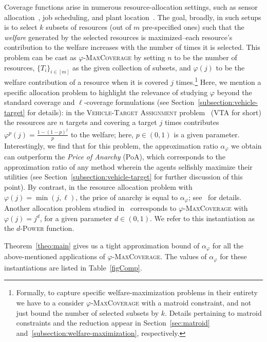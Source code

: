 Coverage functions arise in numerous resource-allocation settings, such as sensor allocation~\cite{MW08}, job scheduling, and plant location~\cite{CFN77}. The goal, broadly, in such setups is to select $k$ subsets of resources (out of $m$ pre-specified ones) such that the \emph{welfare} generated by the selected resources is maximized--each resource's contribution to the welfare increases with the number of times it is selected. This problem can be cast as $\varphi$-\textsc{MaxCoverage} by setting $n$ to be the number of resources, $\{T_i\}_{i\in [m]}$ as the given collection of subsets, and $\varphi(j)$ to be the welfare contribution of a resource when it is covered $j$ times.\footnote{Formally, to capture specific welfare-maximization problems in their entirety we have to a consider $\varphi$-\textsc{MaxCoverage} with a matroid constraint, and not just bound the number of selected subsets by $k$. Details pertaining to matroid constraints and the reduction appear in Section~\ref{sec:matroid} and~\ref{subsection:welfare-maximization}, respectively.}  Here, we mention a specific allocation problem to highlight the relevance of studying $\varphi$ beyond the standard coverage and $\ell$-coverage formulations (see Section~\ref{subsection:vehicle-target} for details): in the \textsc{Vehicle-Target Assignment} problem~\cite{Murphey00,PM19} (\textsc{VTA} for short) the resources are $n$ targets and covering a target $j$ times contributes $\varphi^p(j) = \frac{1-(1-p)^j}{p}$ to the welfare; here, $p \in (0,1)$ is a given parameter. Interestingly, we find that for this problem, the approximation ratio $\alpha_{\varphi}$ we obtain can outperform the \emph{Price of Anarchy} (PoA), which corresponds to the approximation ratio of any method wherein the agents selfishly maximize their utilities (see Section~\ref{subsection:vehicle-target} for further discussion of this point). By contrast, in the resource allocation problem with $\varphi(j) = \min(j, \ell)$, the price of anarchy is equal to $\alpha_{\varphi}$; see~\cite{CPM19} for details. Another allocation problem studied in~\cite{PM19} corresponds to $\varphi$-\textsc{MaxCoverage} with $\varphi(j) = j^d$, for a given parameter $d \in (0,1)$. We refer to this instantiation as the $d$-\textsc{Power} function. 

Theorem~\ref{theo:main} gives us a tight approximation bound of $\alpha_{\varphi}$ for all the above-mentioned applications of $\varphi$-\textsc{MaxCoverage}. The values of $\alpha_{\varphi}$ for these instantiations are listed in Table~\ref{figComp}. 

